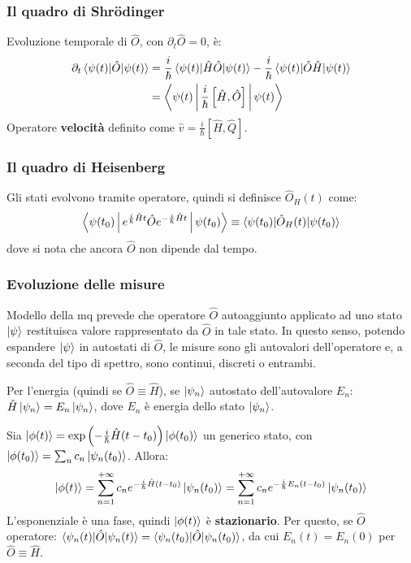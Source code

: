 \documentclass[10pt, a4paper]{scrartcl} %
\numberwithin{equation}{subsection}
\theoremstyle{style2}
\theoremstyle{style1}
\begin{document}
\subsubsection{Il quadro di Shr\"odinger}
Evoluzione temporale di $\hat{O}$, con $\partial _t \hat{O}=0$, \`e: 
\begin{equation}
	\begin{split}
		\partial _t  \braket{\psi (t)|\hat{O}|\psi (t)} &= \frac{i}{\hbar }\braket{\psi (t)|\hat{H}\hat{O}|\psi (t)} - \frac{i}{\hbar }\braket{\psi (t)|\hat{O}\hat{H}|\psi (t)} \\
	&= \Braket{\psi (t)|\frac{i}{\hbar }\left[ \hat{H},\hat{O} \right] |\psi (t)} 
	\end{split}
\end{equation}
Operatore \textbf{velocit\`a} definito come $\hat{v}= \frac{i}{\hbar }\left[ \hat{H},\hat{Q} \right] $.

\subsubsection{Il quadro di Heisenberg}

Gli stati evolvono tramite operatore, quindi si definisce $\hat{O}_H (t)$ come:
\begin{equation}
	\Braket{\psi (t_0)|e^{\frac{i}{\hbar }\hat{H}t} \hat{O}e^{-\frac{i}{\hbar }\hat{H}t} |\psi (t_0)} \equiv \braket{\psi (t_0)|\hat{O}_H(t)|\psi (t_0)} 
\end{equation}
dove si nota che ancora $\hat{O}$ non dipende dal tempo.
\subsubsection{Evoluzione delle misure}

Modello della mq prevede che operatore $\hat{O}$ autoaggiunto applicato ad uno stato $\ket{\psi } $ restituisca valore rappresentato da $\hat{O}$ in tale stato. In questo senso, potendo espandere $\ket{\psi } $ in autostati di $\hat{O}$, le misure sono gli autovalori dell'operatore e, a seconda del tipo di spettro, sono continui, discreti o entrambi.

Per l'energia (quindi se $\hat{O}\equiv \hat{H}$), se $\ket{\psi _n} $ autostato dell'autovalore $E_n$: $\hat{H}\ket{\psi _n} = E_n \ket{\psi _n} $, dove $E_n$ \`e energia dello stato $\ket{\psi _n} $. 

Sia $\ket{\phi(t) }  = \exp\left(-\frac{i}{\hbar }\hat{H}(t-t_0)\right) \ket{\phi (t_0)} $ un generico stato, con $\ket{\phi (t_0)} =\sum_{n}^{} c_n \ket{\psi _n(t_0)} $. Allora:
\begin{equation}
	\ket{\phi (t)} = \sum_{n=1}^{+\infty} c_n e^{-\frac{i}{\hbar } \hat{H}(t-t_0)} \ket{\psi _n(t_0)} = \sum_{n=1}^{+\infty} c_n e^{-\frac{i}{\hbar }E_n (t-t_0)} \ket{\psi _n(t_0)}  
\end{equation}
L'esponenziale \`e una fase, quindi $\ket{\phi (t)} $ \`e \textbf{stazionario}. Per questo, se $\hat{O}$ operatore: $\braket{\psi _n(t)|\hat{O}|\psi _n(t)} = \braket{\psi _n(t_0)|\hat{O}|\psi _n(t_0)} $, da cui $E_n(t) = E_n(0)$ per $\hat{O}\equiv \hat{H}$.
\end{document}
